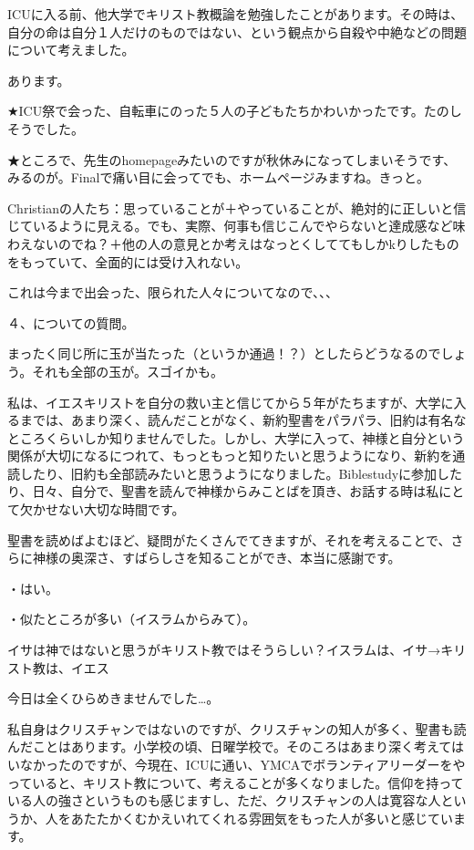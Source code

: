 \item
ICUに入る前、他大学でキリスト教概論を勉強したことがあります。その時は、自分の命は自分１人だけのものではない、という観点から自殺や中絶などの問題について考えました。

\item

あります。

★ICU祭で会った、自転車にのった５人の子どもたちかわいかったです。たのしそうでした。

★ところで、先生のhomepageみたいのですが秋休みになってしまいそうです、みるのが。Finalで痛い目に会ってでも、ホームページみますね。きっと。

Christianの人たち：思っていることが＋やっていることが、絶対的に正しいと信じているように見える。でも、実際、何事も信じこんでやらないと達成感など味わえないのでね？＋他の人の意見とか考えはなっとくしててもしかkりしたものをもっていて、全面的には受け入れない。

これは今まで出会った、限られた人々についてなので、、、

\item
４、についての質問。

まったく同じ所に玉が当たった（というか通過！？）としたらどうなるのでしょう。それも全部の玉が。スゴイかも。

\item
私は、イエスキリストを自分の救い主と信じてから５年がたちますが、大学に入るまでは、あまり深く、読んだことがなく、新約聖書をパラパラ、旧約は有名なところくらいしか知りませんでした。しかし、大学に入って、神様と自分という関係が大切になるにつれて、もっともっと知りたいと思うようになり、新約を通読したり、旧約も全部読みたいと思うようになりました。Biblestudyに参加したり、日々、自分で、聖書を読んで神様からみことばを頂き、お話する時は私にとて欠かせない大切な時間です。

聖書を読めばよむほど、疑問がたくさんでてきますが、それを考えることで、さらに神様の奥深さ、すばらしさを知ることができ、本当に感謝です。

\item
・はい。

・似たところが多い（イスラムからみて）。

イサは神ではないと思うがキリスト教ではそうらしい？イスラムは、イサ→キリスト教は、イエス

\item
今日は全くひらめきませんでした…。

\item
私自身はクリスチャンではないのですが、クリスチャンの知人が多く、聖書も読んだことはあります。小学校の頃、日曜学校で。そのころはあまり深く考えてはいなかったのですが、今現在、ICUに通い、YMCAでボランティアリーダーをやっていると、キリスト教について、考えることが多くなりました。信仰を持っている人の強さというものも感じますし、ただ、クリスチャンの人は寛容な人というか、人をあたたかくむかえいれてくれる雰囲気をもった人が多いと感じています。

